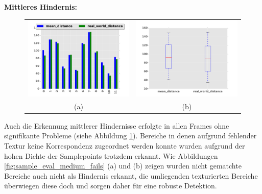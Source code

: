 \noindent
\textbf{Mittleres Hindernis:}\\

\begin{figure}[h]
	\centering
	\begin{tabular}{cc}
	\includegraphics[width=7cm]{img/evaluation/diagrams/sample_medium_bar}&
	\includegraphics[width=7cm]{img/evaluation/diagrams/sample_medium_box}\\
	 (a) & (b)
	\end{tabular}
	\caption{}
    \label{fig:sample_eval_medium}
\end{figure}

\noindent
Auch die Erkennung mittlerer Hindernisse erfolgte in allen Frames ohne signifikante Probleme (siehe Abbildung \ref{fig:sample_eval_medium}). Bereiche in denen aufgrund fehlender Textur keine Korrespondenz zugeordnet werden konnte wurden aufgrund der hohen Dichte der Samplepoints trotzdem erkannt. Wie Abbildungen \ref{fig:sample_eval_medium_fails} (a) und (b) zeigen wurden nicht gematchte Bereiche auch nicht als Hindernis erkannt, die umliegenden texturierten Bereiche überwiegen diese doch und sorgen daher für eine robuste Detektion.

